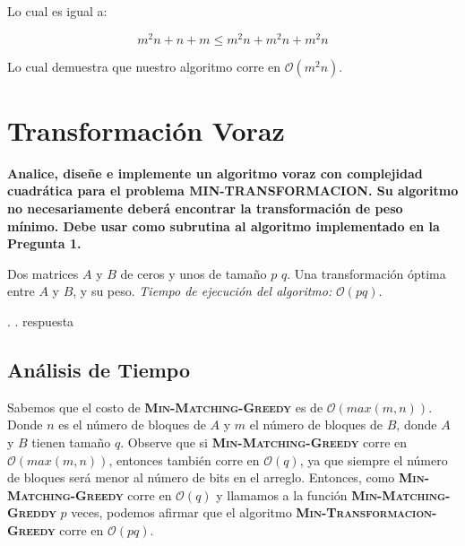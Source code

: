 \documentclass[12pt,a4,paper]{article}
\begin{document}
Lo cual es igual a:

$$m^{2}n + n + m \leq m^{2}n + m^{2}n + m^{2}n$$

Lo cual demuestra que nuestro algoritmo corre en $\mathcal{O}(m^{2}n)$.

\section{Transformación Voraz}

\textbf{Analice, diseñe e implemente un algoritmo voraz con complejidad cuadrática para el problema \textsc{MIN-TRANSFORMACION}. Su algoritmo no necesariamente deberá encontrar la transformación de peso mínimo. Debe usar como subrutina al algoritmo implementado en la Pregunta 1.} \\

\begin{algorithmic}[1]
    \REQUIRE Dos matrices $A$ y $B$ de ceros y unos de tamaño $p$  $q$. \newline
    \ENSURE Una transformación óptima entre $A$ y $B$, y su peso. \newline
    \textit{Tiempo de ejecuci\'on del algoritmo:} $\mathcal{O}(pq)$.\newline\newline
    
    
     .
     .
     \ENDFOR
     \RETURN respuesta
        
\end{algorithmic}
\subsection*{Análisis de Tiempo}

Sabemos que el costo de \textbf{\textsc{Min-Matching-Greedy}} es de $\mathcal{O}(max(m,n))$. Donde $n$ es el número de bloques de $A$ y $m$ el número de bloques de $B$, donde $A$ y $B$ tienen tamaño $q$. Observe que si \textbf{\textsc{Min-Matching-Greedy}} corre en $\mathcal{O}(max(m,n))$, entonces también corre en $\mathcal{O}(q)$, ya que siempre el número de bloques será menor al número de bits en el arreglo. Entonces, como \textbf{\textsc{Min-Matching-Greedy}} corre en $\mathcal{O}(q)$ y llamamos a la función \textbf{\textsc{Min-Matching-Greddy}} $p$ veces, podemos afirmar que el algoritmo \textbf{\textsc{Min-Transformacion-Greedy}} corre en $\mathcal{O}(pq)$.
\end{document}
